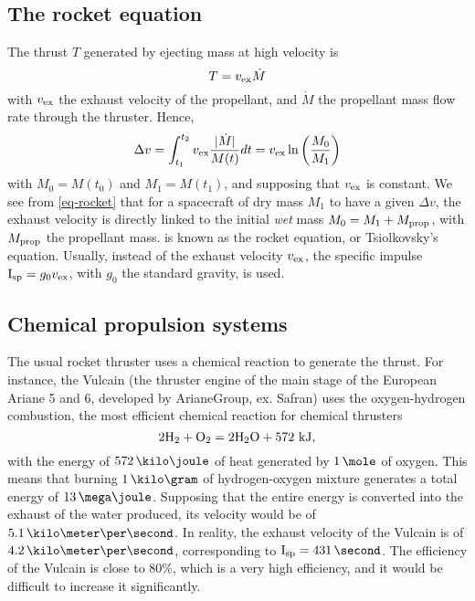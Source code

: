 \subsection{The rocket equation}
The thrust $T$ generated by ejecting mass at high velocity is
\begin{equation} \label{eq-thurst}
  T = v_{\rm ex} \dot{M}
\end{equation}
with $v_{\rm ex}$ the exhaust velocity of the propellant, and $\dot{M}$ the propellant mass flow rate through the thruster.
Hence,
\begin{equation} \label{eq-rocket}
  \Delta v = \int_{t_1}^{t_2} v_{\rm ex} \frac{ \lvert\dot{M}\rvert}{M(t)} dt = v_{\rm ex} \ln \left( \frac{M_0}{M_1} \right)
\end{equation}
with $M_0 = M(t_0)$ and $M_1=M(t_1)$, and supposing that $v_{\rm ex}$ is constant.
We see from \cref{eq-rocket} that for a spacecraft of dry mass $M_1$ to have a given $\Delta v$, the exhaust velocity is directly linked to the initial \emph{wet} mass $M_0 = M_1 + M_{\rm prop}$, with $M_{\rm prop}$ the propellant mass.
 is known as the rocket equation, or Tsiolkovsky's equation.
Usually, instead of the exhaust velocity $v_{\rm ex}$, the specific impulse ${\rm I_{\rm sp} } = g_0 v_{\rm ex}$, with $g_0$ the standard gravity, is used.

\subsection{Chemical propulsion systems}
The usual rocket thruster uses a chemical reaction to generate the thrust.
For instance, the Vulcain (the thruster engine of the main stage of the European Ariane 5 and 6, developed by ArianeGroup, ex. Safran) uses the oxygen-hydrogen combustion, the most efficient chemical reaction for chemical thrusters \citep{nasa-H2O2}
\begin{equation*}
  2 {\rm H_2} + { \rm O_2} = 2 {\rm H_2 O} + 572 \text{~kJ},
\end{equation*}
with the energy of $572\,\kilo\joule$ of heat generated by $1\,\mole$ of oxygen.
This means that burning $1\,\kilo\gram$ of hydrogen-oxygen mixture generates a total energy of $13\,\mega\joule$. 
Supposing that the entire energy is converted into the exhaust of the water produced, its velocity would be of $5.1 \,\kms$.
In reality, the exhaust velocity of the Vulcain is of $4.2 \,\kms$, corresponding to $\Isp=431 \,\second$.
The efficiency of the Vulcain is close to 80\%, which is a very high efficiency, and it would be difficult to increase it significantly. 

